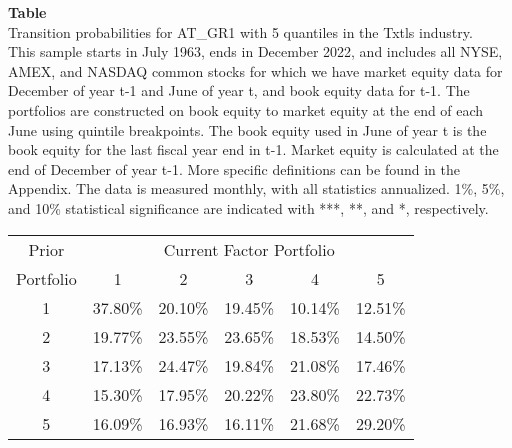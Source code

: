 \begin{table*}[ht!]
\raggedright
{}
\label{tab: transition_probs_AT_GR1_Txtls_with_5_quantiles}
\textbf{Table \thetable} \\
Transition probabilities for AT_GR1 with 5 quantiles in the Txtls industry. \\
\hspace*{1em}This sample starts in July 1963, ends in December 2022, and includes all NYSE, AMEX, and NASDAQ common stocks for which we have market equity data for December of year t-1 and June of year t, and book equity data for t-1. The portfolios are constructed on book equity to market equity at the end of each June using quintile breakpoints.  The book equity used in June of year t is the book equity for the last fiscal year end in t-1.  Market equity is calculated at the end of December of year t-1.  More specific definitions can be found in the Appendix.  The data is measured monthly, with all statistics annualized.  1\%, 5\%, and 10\% statistical significance are indicated with ***, **, and *, respectively. \\
\vspace{0.5em}
\centering
\begin{adjustbox}{max width=\textwidth}
\begin{tabular}{@{}cccccc@{}}
\toprule
Prior & \multicolumn{5}{c}{Current Factor Portfolio} \\
Portfolio & 1 & 2 & 3 & 4 & 5 \\
\midrule
1 & 37.80\% & 20.10\% & 19.45\% & 10.14\% & 12.51\% \\
2 & 19.77\% & 23.55\% & 23.65\% & 18.53\% & 14.50\% \\
3 & 17.13\% & 24.47\% & 19.84\% & 21.08\% & 17.46\% \\
4 & 15.30\% & 17.95\% & 20.22\% & 23.80\% & 22.73\% \\
5 & 16.09\% & 16.93\% & 16.11\% & 21.68\% & 29.20\% \\
\bottomrule
\end{tabular}
\end{adjustbox}
\end{table*}